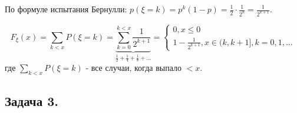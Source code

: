 По формуле испытания Бернулли: $p(\xi = k) = p^k(1-p) = \frac{1}{2} \cdot \frac{1}{2^k} = \frac{1}{2^{k+1}}$.
\begin{figure}[H]
\end{figure}
\[ F_{\xi}(x) = \sum_{k < x} P(\xi = k) = \underbrace{\sum_{k=0}^{k<x} \frac{1}{2^{k+1}}}_{\frac{1}{2} + \frac{1}{4} + \frac{1}{8} + \dots} =
\begin{cases}
	0, x \le 0 \\
	1 - \frac{1}{2^{k+1}}, x \in (k, k+1], k = 0,1,\dots
\end{cases}
\]
где $\sum_{k < x} P(\xi = k)$ - все случаи, когда выпало $<x$.
\begin{figure}[H]
\end{figure}

\subsection*{Задача 3.}

